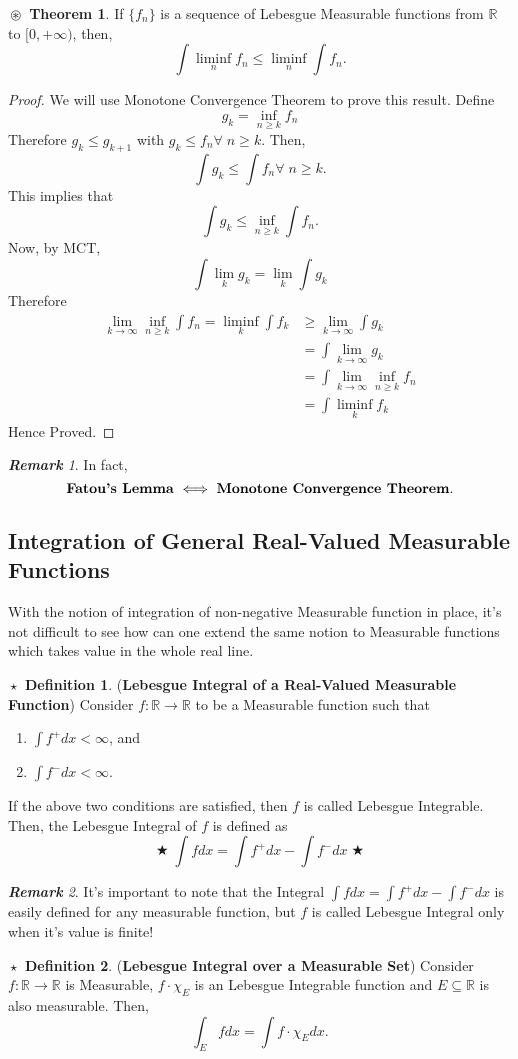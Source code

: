 \documentclass{article}
\theoremstyle{definition}
\newtheorem{definition}{$\boxed{\star}$ Definition}
\newtheorem{theorem}{$\boxed{\boxed{\circledast}}$ Theorem}
\theoremstyle{remark}
\newtheorem*{remark}{\textbf{Remark}}
\theoremstyle{definition}
\theoremstyle{definition}
\theoremstyle{definition}
\newcommand{\R}{\mathbb{R}}
\begin{document}
\begin{theorem}\label{T-6}
	If $ \{f_n\} $ is a sequence of Lebesgue Measurable functions from $ \R $ to $ [0,+\infty) $, then,
	\[\int \liminf_n f_n \le \liminf_n \int f_n.\]
\end{theorem}
\begin{proof}
	We will use Monotone Convergence Theorem to prove this result. Define
	\[g_k = \inf_{n\ge k} f_n\]
	Therefore $ g_k \le g_{k+1} $ with $ g_k \le f_n \forall\; n\ge k$. Then,
	\[\int g_k \le  \int f_n \forall\; n\ge k.\]
	This implies that 
	\[\int g_k \le \inf_{n\ge k} \int f_n.\]
	Now, by MCT, 
	\[\int \lim_k g_k = \lim_k \int g_k\]
	Therefore 
	\begin{align*}
		\lim_{k\to \infty} \inf_{n\ge k} \int f_n = \liminf_k \int f_k &\ge \lim_{k\to \infty} \int g_k\\
		&= \int \lim_{k\to \infty} g_k\\
		&= \int \lim_{k\to \infty} \inf_{n\ge k} f_n\\
		&= \int \liminf_k f_k
	\end{align*}
Hence Proved.
\end{proof}
\begin{remark}
	In fact,
	\[\text{\textbf{Fatou's Lemma} $ \iff $ \textbf{Monotone Convergence Theorem}.}\]
\end{remark}
\hrulefill
\newpage
\subsection{Integration of General Real-Valued Measurable Functions}
With the notion of integration of non-negative Measurable function in place, it's not difficult to see how can one extend the same notion to Measurable functions which takes value in the whole real line.
\begin{definition}
	(\textbf{Lebesgue Integral of a Real-Valued Measurable Function}) Consider $ f: \R \to \R $ to be a Measurable function such that 
	\begin{enumerate}
		\item {$ \int f^{+}dx < \infty $, and}
		\item {$ \int f^{-}dx < \infty $.}
	\end{enumerate}
If the above two conditions are satisfied, then $ f $ is called Lebesgue Integrable. Then, the Lebesgue Integral of $ f $ is defined as
\[\bigstar \;\boxed{\int fdx = \int f^{+} dx - \int f^{-} dx} \;\bigstar \]
\end{definition}
\begin{remark}
	It's important to note that the Integral $ \int fdx = \int f^{+} dx - \int f^{-} dx $ is easily defined for any measurable function, but $ f $ is called Lebesgue Integral only when it's value is finite!
\end{remark}
\hrulefill
\begin{definition}
	(\textbf{Lebesgue Integral over a Measurable Set}) Consider $ f : \R \to \R $ is Measurable, $ f\cdot \chi_{E} $ is an Lebesgue Integrable function and $ E \subseteq \R $ is also measurable. Then, 
	\[\int_{E} f dx = \int f\cdot \chi_{E} dx .\]
\end{definition}
\hrulefill
\end{document}
